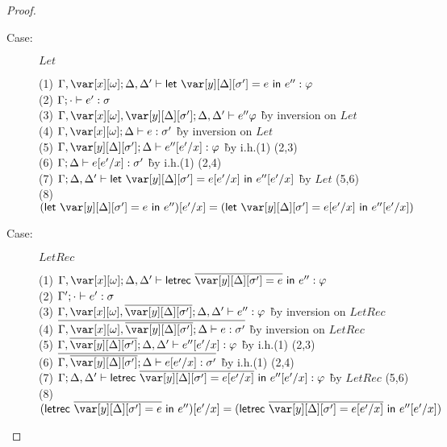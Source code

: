 \begin{proof}
\begin{description}
\item[Case:] $Let$
\begin{tabbing}
    (1) $\G, \xo; \D, \D' \vdash \llet{\yD = e}{e''} : \vp$\\
    (2) $\Gamma; \cdot \vdash e' : \sigma$\\
    (3) $\G,\xo,\yD; \D, \D' \vdash e'' \vp$ \` by inversion on $Let$\\
    (4) $\G,\xo; \D \vdash e : \s'$ \` by inversion on $Let$\\
    (5) $\G,\yD; \D \vdash e''[e'/x] : \vp$ \` by i.h.(1) (2,3)\\
    (6) $\Gamma; \Delta \vdash e[e'/x] : \sigma'$ \` by i.h.(1) (2,4)\\
    (7) $\G;\D,\D' \vdash \llet{\yD = e[e'/x]}{e''[e'/x]}$ \` by $Let$ (5,6)\\
    (8) $(\llet{\yD = e}{e''})[e'/x] = (\llet{\yD = e[e'/x]}{e''[e'/x]})$
\end{tabbing}

\item[Case:] $LetRec$
\begin{tabbing}
    (1) $\G, \xo; \D, \D' \vdash \lletrec{\ov{\yD = e}}{e''} : \vp$\\
    (2) $\Gamma'; \cdot \vdash e' : \sigma$\\
    (3) $\G,\xo,\ov{\yD}; \D, \D' \vdash e'' : \vp$ \` by inversion on $LetRec$\\
    (4) $\ov{\G,\xo, \ov{\yD}; \D \vdash e : \s'}$ \` by inversion on $LetRec$\\
    (5) $\G, \ov{\yD}; \D, \D' \vdash e''[e'/x] : \vp$ \` by i.h.(1) (2,3)\\
    (6) $\ov{\G,\ov{\yD}; \D \vdash e[e'/x] : \s'}$ \` by i.h.(1) (2,4)\\
    (7) $\G; \D, \D' \vdash \lletrec{\ov{\yD = e[e'/x]}}{e''[e'/x]} : \vp$ \` by $LetRec$ (5,6)\\
    (8) $(\lletrec{\ov{\yD = e}}{e''})[e'/x] = (\lletrec{\ov{\yD = e[e'/x]}}{e''[e'/x]})$
\end{tabbing}



\end{description}
\end{proof}
